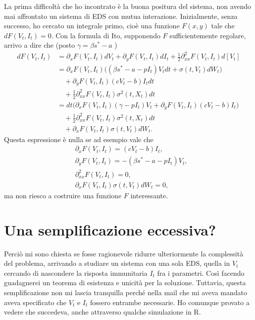 \documentclass[12pt,a4paper,oneside]{amsart}
\theoremstyle{definition}
\begin{document}
La prima difficoltà che ho incontrato è la buona positura del sistema, non avendo mai affrontato un sistema di EDS con mutua interazione. Inizialmente, senza successo, ho cercato un integrale primo, cioè una funzione $F(x,y)$ tale che $dF(V_t,I_t)=0$. Con la formula di Ito, supponendo $F$ sufficientemente regolare, arrivo a dire che (posto $\gamma=\beta s^* -a $ ) \begin{align*}
dF(V_t,I_t) &= \partial_x F(V_t,I_t) dV_t + \partial_y F(V_t,I_t) dI_t +\frac{1}{2} \partial^2_{xx}F(V_t,I_t) d[V_t] \\
&=\partial_x F(V_t,I_t) \bigg(\left(\beta s^* -a -pI_t\right)V_tdt + \sigma(t,V_t)dW_t\bigg) \\
& \quad + \partial_y F(V_t,I_t) \left(cV_t-b\right)I_tdt \\
& \quad +\frac{1}{2} \partial^2_{xx}F(V_t,I_t) \sigma^2(t,X_t) dt \\
&= dt \bigg( \partial_x F(V_t,I_t) \left(\gamma-pI_t\right)V_t +  \partial_y F(V_t,I_t) \left(cV_t-b\right)I_t\bigg) \\
& \quad +\frac{1}{2} \partial^2_{xx}F(V_t,I_t) \sigma^2(t,X_t) dt\\
& \quad + \partial_x F(V_t,I_t)\sigma(t,V_t)dW_t .
\end{align*}
Questa espressione è nulla se ad esempio vale che
\begin{align*}
&\partial_x F(V_t,I_t)  = \left(cV_t-b\right)I_t, \\
&\partial_y F(V_t,I_t)  = -\left(\beta s^* -a -pI_t\right)V_t,\\
&\partial^2_{xx}F(V_t,I_t) = 0, \\
&\partial_x F(V_t,I_t)\sigma(t,V_t)dW_t = 0,
\end{align*}
ma non riesco a costruire una funzione $F$ interessante.

\section{Una semplificazione eccessiva?}

Perciò mi sono chiesta se fosse ragionevole ridurre ulteriormente la complessità del problema, arrivando a studiare un sistema con una sola EDS, quella in $V_t$ cercando di nascondere la risposta immunitaria $I_t$ fra i parametri. Così facendo guadagnerei un teorema di esistenza e unicità per la soluzione. Tuttavia, questa semplificazione non mi lascia tranquilla perché nella mail che mi aveva mandato aveva specificato che $V_t$ e $I_t$ fossero entrambe necessarie. Ho comunque provato a vedere che succedeva, anche attraverso qualche simulazione in R.
\end{document}
